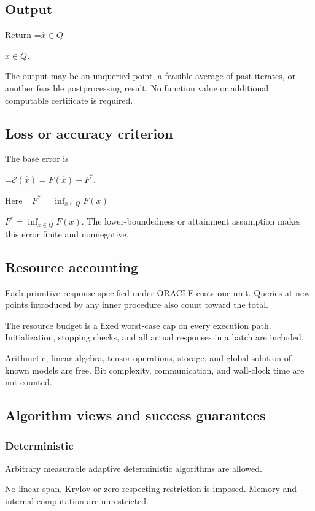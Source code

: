 \documentclass[10pt,a4paper]{article}
\newcommand{\AtlasMath}[1]{\par\begingroup\centering\setbox0=\hbox{$\displaystyle #1$}\ifdim\wd0>1.4\linewidth\typeout{ATLAS WIDE FORMULA: \the\wd0}\fi\ifdim\wd0>\linewidth\resizebox{\linewidth}{!}{\box0}\else\box0\fi\par\endgroup}
\newcommand{\AtlasInlineMath}[1]{\begingroup\setbox0=\hbox{$#1$}\ifdim\wd0>.4\linewidth\endgroup\AtlasMath{#1}\else\endgroup$#1$\fi}
\begin{document}
\subsection{Output}
Return \AtlasInlineMath{\widehat{x}\in Q}.

The output may be an unqueried point, a feasible average of past iterates, or another feasible postprocessing result. No function value or additional computable certificate is required.

\subsection{Loss or accuracy criterion}
The base error is


\AtlasMath{\mathcal{E}(\widehat{x})=F(\widehat{x})-F^*.}


Here \AtlasInlineMath{F^*=\inf_{x\in Q}F(x)}. The lower-boundedness or attainment assumption makes this error finite and nonnegative.

\subsection{Resource accounting}
Each primitive response specified under ORACLE costs one unit. Queries at new points introduced by any inner procedure also count toward the total.

The resource budget is a fixed worst-case cap on every execution path. Initialization, stopping checks, and all actual responses in a batch are included.

Arithmetic, linear algebra, tensor operations, storage, and global solution of known models are free. Bit complexity, communication, and wall-clock time are not counted.

\subsection{Algorithm views and success guarantees}
\subsubsection{Deterministic}
Arbitrary measurable adaptive deterministic algorithms are allowed.

No linear-span, Krylov or zero-respecting restriction is imposed. Memory and internal computation are unrestricted.
\end{document}
